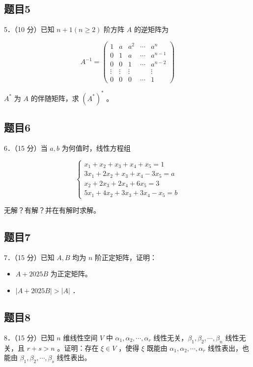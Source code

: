 \documentclass{article}
\begin{document}
\subsection{题目5}
5．（10 分）已知 \(n+1(n \geq 2)\) 阶方阵 \(A\) 的逆矩阵为

\[
A^{-1}=\left(\begin{array}{ccccc}
1 & a & a^{2} & \cdots & a^{n} \\
0 & 1 & a & \cdots & a^{n-1} \\
0 & 0 & 1 & \cdots & a^{n-2} \\
\vdots & \vdots & \vdots & & \vdots \\
0 & 0 & 0 & \cdots & 1
\end{array}\right)
\]

\(A^{*}\) 为 \(A\) 的伴随矩阵，求 \(\left(A^{*}\right)^{*}\) 。

\subsection{题目6}
6．（15 分）当 \(a, b\) 为何值时，线性方程组

\[
\left\{\begin{array}{l}
x_{1}+x_{2}+x_{3}+x_{4}+x_{5}=1 \\
3 x_{1}+2 x_{2}+x_{3}+x_{4}-3 x_{5}=a \\
x_{2}+2 x_{3}+2 x_{4}+6 x_{5}=3 \\
5 x_{1}+4 x_{2}+3 x_{3}+3 x_{4}-x_{5}=b
\end{array}\right.
\]

无解？有解？并在有解时求解。

\subsection{题目7}
7．（15 分）已知 \(A, B\) 均为 \(n\) 阶正定矩阵，证明：

\begin{itemize}
  \item[（1）] \(A+2025 B\) 为正定矩阵。
  \item[（2）] \(|A+2025 B|>|A|\) ．
\end{itemize}

\subsection{题目8}
8．（15 分）已知 \(n\) 维线性空间 \(V\) 中 \(\alpha_{1}, \alpha_{2}, \cdots, \alpha_{r}\) 线性无关，\(\beta_{1}, \beta_{2}, \cdots, \beta_{n}\) 线性无关，且 \(r+s>n\) 。证明：存在 \(\xi \in V\) ，使得 \(\xi\) 既能由 \(\alpha_{1}, \alpha_{2}, \cdots, \alpha_{r}\) 线性表出，也能由 \(\beta_{1}, \beta_{2}, \cdots, \beta_{s}\) 线性表出。
\end{document}
